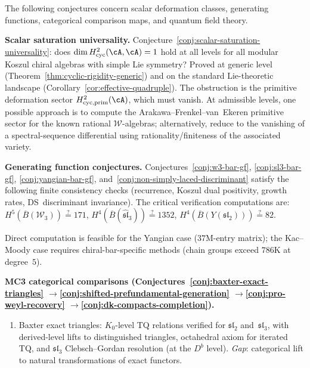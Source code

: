 \begin{remark}
\label{rem:conjecture-attack-strategies}
The following conjectures concern scalar deformation classes, generating
functions, categorical comparison maps, and quantum field theory.

\smallskip\noindent
\textbf{Scalar saturation universality.}
Conjecture~\ref{conj:scalar-saturation-universality}: does
$\dim H^2_{\mathrm{cyc}}(\cA,\cA) = 1$ hold at all levels for all
modular Koszul chiral algebras with simple Lie symmetry?
Proved at generic level
(Theorem~\ref{thm:cyclic-rigidity-generic}) and on the standard
Lie-theoretic landscape
(Corollary~\ref{cor:effective-quadruple}).
The obstruction is the primitive deformation sector
$H^2_{\mathrm{cyc,prim}}(\cA)$, which must vanish.
At admissible levels, one possible approach is to compute the
Arakawa--Frenkel--van~Ekeren primitive sector for the
known rational $\mathcal{W}$-algebras; alternatively, reduce to
the vanishing of a spectral-sequence differential using
rationality/finiteness of the associated variety.

\smallskip\noindent
\textbf{Generating function conjectures.}
Conjectures~\ref{conj:w3-bar-gf}, \ref{conj:sl3-bar-gf},
\ref{conj:yangian-bar-gf}, and~\ref{conj:non-simply-laced-discriminant}
satisfy the following finite consistency checks
(recurrence, Koszul dual positivity, growth rates, DS~discriminant
invariance).  The critical verification computations are:
$H^5(\overline{B}(\mathcal{W}_3)) \stackrel{?}{=} 171$,
$H^4(\overline{B}(\widehat{\mathfrak{sl}}_3)) \stackrel{?}{=} 1352$,
$H^4(\overline{B}(Y(\mathfrak{sl}_2))) \stackrel{?}{=} 82$.

Direct computation is feasible for the Yangian case ($37$M-entry
matrix); the Kac--Moody case requires chiral-bar-specific methods
(chain groups exceed $786$K at degree~$5$).

\smallskip\noindent
\textbf{MC3 categorical comparisons
(Conjectures~\ref{conj:baxter-exact-triangles}%
$\to$\ref{conj:shifted-prefundamental-generation}%
$\to$\ref{conj:pro-weyl-recovery}%
$\to$\ref{conj:dk-compacts-completion}).}
\begin{enumerate}[label=\textup{(\roman*)},nosep]
\item Baxter exact triangles: $K_0$-level TQ relations verified for $\mathfrak{sl}_2$ and~$\mathfrak{sl}_3$, with
  derived-level lifts to distinguished triangles, octahedral axiom
  for iterated TQ, and $\mathfrak{sl}_3$ Clebsch--Gordan resolution
  (at the $D^b$ level).
  \emph{Gap}: categorical lift to natural transformations of exact functors.


\end{enumerate}
\end{remark}
